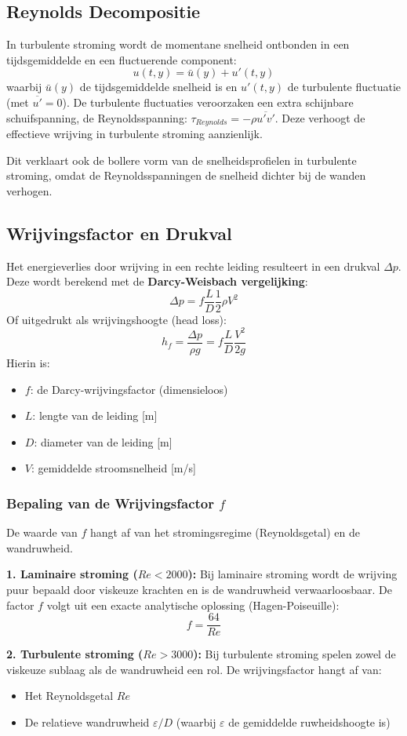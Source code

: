 \documentclass[a4paper,11pt,twoside]{report}
\begin{document}
\subsection{Reynolds Decompositie}
In turbulente stroming wordt de momentane snelheid ontbonden in een tijdsgemiddelde en een fluctuerende component:
\[
u(t,y) = \bar{u}(y) + u'(t,y)
\]
waarbij $\bar{u}(y)$ de tijdsgemiddelde snelheid is en $u'(t,y)$ de turbulente fluctuatie (met $\overline{u'} = 0$).
De turbulente fluctuaties veroorzaken een extra schijnbare schuifspanning, de Reynoldsspanning: $\tau_{Reynolds} = -\rho \overline{u'v'}$. Deze verhoogt de effectieve wrijving in turbulente stroming aanzienlijk.

Dit verklaart ook de bollere vorm van de snelheidsprofielen in turbulente stroming, omdat de Reynoldsspanningen de snelheid dichter bij de wanden verhogen.

\subsection{Wrijvingsfactor en Drukval}
Het energieverlies door wrijving in een rechte leiding resulteert in een drukval $\Delta p$. Deze wordt berekend met de \textbf{Darcy-Weisbach vergelijking}:
\[
\Delta p = f \frac{L}{D} \frac{1}{2}\rho V^2
\]
Of uitgedrukt als wrijvingshoogte (head loss):
\[
h_f = \frac{\Delta p}{\rho g} = f \frac{L}{D} \frac{V^2}{2g}
\]
Hierin is:
\begin{itemize}
    \item $f$: de Darcy-wrijvingsfactor (dimensieloos)
    \item $L$: lengte van de leiding [m]
    \item $D$: diameter van de leiding [m]
    \item $V$: gemiddelde stroomsnelheid [m/s]
\end{itemize}

\subsubsection{Bepaling van de Wrijvingsfactor $f$}
De waarde van $f$ hangt af van het stromingsregime (Reynoldsgetal) en de wandruwheid.

\textbf{1. Laminaire stroming ($Re < 2000$):}
Bij laminaire stroming wordt de wrijving puur bepaald door viskeuze krachten en is de wandruwheid verwaarloosbaar. De factor $f$ volgt uit een exacte analytische oplossing (Hagen-Poiseuille):
\[
f = \frac{64}{Re}
\]

\textbf{2. Turbulente stroming ($Re > 3000$):}
Bij turbulente stroming spelen zowel de viskeuze sublaag als de wandruwheid een rol. De wrijvingsfactor hangt af van:
\begin{itemize}
    \item Het Reynoldsgetal $Re$
    \item De relatieve wandruwheid $\varepsilon/D$ (waarbij $\varepsilon$ de gemiddelde ruwheidshoogte is)
\end{itemize}
\end{document}
